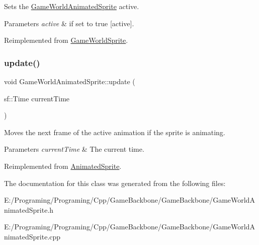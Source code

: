 Sets the \hyperlink{class_game_world_animated_sprite}{Game\+World\+Animated\+Sprite} active. 


\begin{DoxyParams}{Parameters}
{\em active} & if set to {\ttfamily true} \mbox{[}active\mbox{]}.\\
\hline
\end{DoxyParams}


Reimplemented from \hyperlink{class_game_world_sprite_a4b8597b947076f847d20c66be7db8847}{Game\+World\+Sprite}.

\mbox{\label{class_game_world_animated_sprite_a6fab62c5ed11541027a88c695a8b6147}} 
\subsubsection{\texorpdfstring{update()}{update()}}
{\footnotesize\ttfamily void Game\+World\+Animated\+Sprite\+::update (\begin{DoxyParamCaption}\item[{sf\+::\+Time}]{current\+Time }\end{DoxyParamCaption})\hspace{0.3cm}{\ttfamily [virtual]}}



Moves the next frame of the active animation if the sprite is animating. 


\begin{DoxyParams}{Parameters}
{\em current\+Time} & The current time.\\
\hline
\end{DoxyParams}


Reimplemented from \hyperlink{class_animated_sprite_afdeda3e3030963a8ba290e23e48acc40}{Animated\+Sprite}.



The documentation for this class was generated from the following files\+:\begin{DoxyCompactItemize}
\item 
E\+:/\+Programing/\+Programing/\+Cpp/\+Game\+Backbone/\+Game\+Backbone/Game\+World\+Animated\+Sprite.\+h\item 
E\+:/\+Programing/\+Programing/\+Cpp/\+Game\+Backbone/\+Game\+Backbone/Game\+World\+Animated\+Sprite.\+cpp\end{DoxyCompactItemize}
